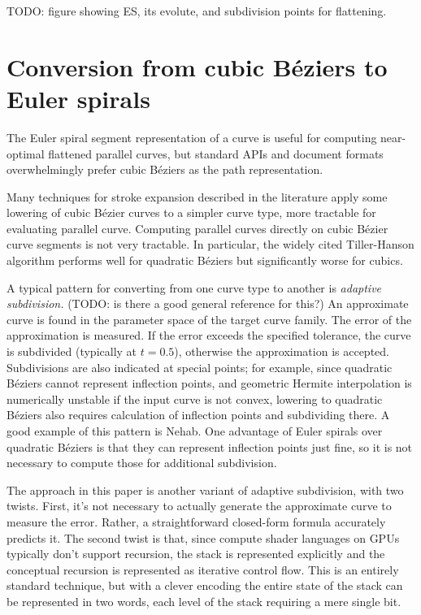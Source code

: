 \documentclass[format=acmsmall]{acmart}
\begin{document}
TODO: figure showing ES, its evolute, and subdivision points for flattening.

\section{Conversion from cubic Béziers to Euler spirals}

The Euler spiral segment representation of a curve is useful for computing near-optimal flattened parallel curves, but standard APIs and document formats overwhelmingly prefer cubic Béziers as the path representation.

Many techniques for stroke expansion described in the literature apply some lowering of cubic Bézier curves to a simpler curve type, more tractable for evaluating parallel curve. Computing parallel curves directly on cubic Bézier curve segments is not very tractable. In particular, the widely cited Tiller-Hanson algorithm\cite{Tiller1984} performs well for quadratic Béziers but significantly worse for cubics.


A typical pattern for converting from one curve type to another is \emph{adaptive subdivision.} (TODO: is there a good general reference for this?) An approximate curve is found in the parameter space of the target curve family. The error of the approximation is measured. If the error exceeds the specified tolerance, the curve is subdivided (typically at $t = 0.5$), otherwise the approximation is accepted. Subdivisions are also indicated at special points; for example, since quadratic Béziers cannot represent inflection points, and geometric Hermite interpolation is numerically unstable if the input curve is not convex, lowering to quadratic Béziers also requires calculation of inflection points and subdividing there. A good example of this pattern is Nehab\cite{Nehab2020}. One advantage of Euler spirals over quadratic Béziers is that they can represent inflection points just fine, so it is not necessary to compute those for additional subdivision.

The approach in this paper is another variant of adaptive subdivision, with two twists. First, it's not necessary to actually generate the approximate curve to measure the error. Rather, a straightforward closed-form formula accurately predicts it. The second twist is that, since compute shader languages on GPUs typically don't support recursion, the stack is represented explicitly and the conceptual recursion is represented as iterative control flow. This is an entirely standard technique, but with a clever encoding the entire state of the stack can be represented in two words, each level of the stack requiring a mere single bit.
\end{document}
